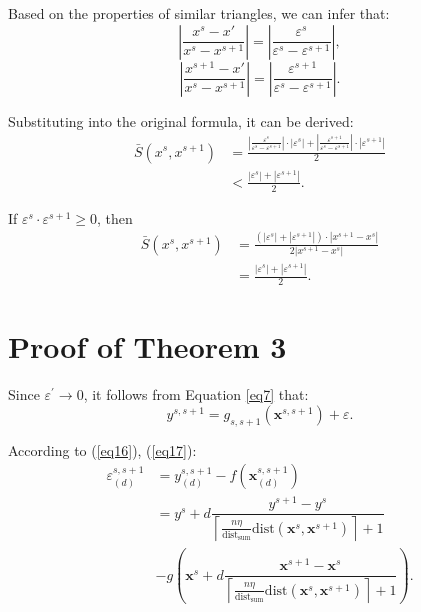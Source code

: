 \documentclass[lettersize,journal]{IEEEtran}
\begin{document}
{Based on the properties of similar triangles, we can 
infer that:
\begin{equation*}
|\frac{x^s-x'}{x^{s}-x^{s+1}}|=|\frac{\varepsilon^s}
{\varepsilon^s-\varepsilon^{s+1}}|,
\end{equation*}
\begin{equation*}
|\frac{x^{s+1}-x'}{x^{s}-x^{s+1}}|=|\frac{\varepsilon^
{s+1}}{\varepsilon^s-\varepsilon^{s+1}}|.
\end{equation*}

Substituting into the original formula, it can be derived:
\begin{equation*}
\begin{aligned}
\bar{S}(x^s,x^{s+1})
&=\frac{|\frac{\varepsilon^s}{\varepsilon^s-\varepsilon^
{s+1}}|\cdot |\varepsilon^{s}|+|\frac{\varepsilon^{s+1}}
{\varepsilon^s-\varepsilon^{s+1}}|\cdot|\varepsilon^
{s+1}|}{2}\\
&<\frac{|\varepsilon^s|+|\varepsilon^{s+1}|}{2}.
\end{aligned}
\end{equation*}

If $\varepsilon^s\cdot\varepsilon^{s+1}\ge0$, then
\begin{equation*}
\begin{aligned}
\bar{S}(x^s,x^{s+1})
&=\frac{(|\varepsilon^s|+|\varepsilon^{s+1}|)\cdot|x^
{s+1}-x^{s}|}{2|x^{s+1}-x^{s}|}\\
&=\frac{|\varepsilon^s|+|\varepsilon^{s+1}|}{2}.
\end{aligned}
\end{equation*}

\section*{Proof of Theorem 3}
Since $\varepsilon^\prime\rightarrow0$, it follows from 
Equation \eqref{eq7} that:
\begin{equation*}
y^{s,s+1}=g_{s,s+1}(\boldsymbol{x}^{s,s+1})+\varepsilon.
\end{equation*}

According to (\ref{eq16}), (\ref{eq17}):
\begin{equation*}
\begin{aligned}
\varepsilon^{s,s+1}_{(d)}
&=y_{(d)}^{s,s+1}-f(\boldsymbol{x}_{(d)}^{s,s+1})\\
&=y^s+d\dfrac{y^{s+1}-y^{s}}{\left\lceil \frac{n\eta}
{\text{dist}_{\text{sum}}}\text{dist}(\boldsymbol{x}^s,
\boldsymbol{x}^{s+1})\right\rceil+1}\\
&-g{(\boldsymbol{x}^s+
d\dfrac{\boldsymbol{x}^{s+1}-\boldsymbol{x}^{s}}{\left
\lceil \frac{n\eta}{\text{dist}_{\text{sum}}}\text{dist}
(\boldsymbol{x}^s,\boldsymbol{x}^{s+1})\right\rceil+1})}.
\end{aligned}
\end{equation*}

}
\end{document}
